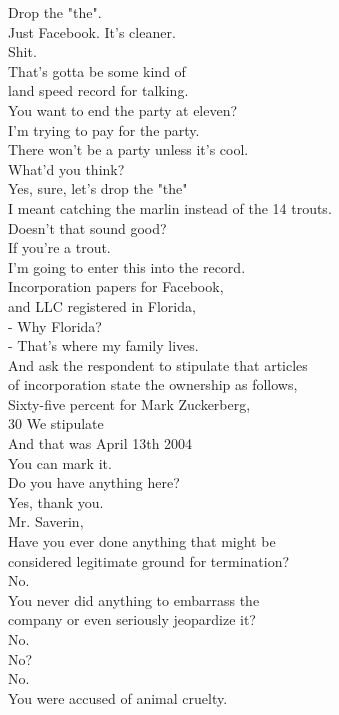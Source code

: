 \documentclass{article}
\begin{document}
\begin{multicols}{3}
Drop the "the".\\
Just Facebook. It's cleaner.\\
Shit.\\
That's gotta be some kind of\\
land speed record for talking.\\
You want to end the party at eleven?\\
I'm trying to pay for the party.\\
There won't be a party unless it's cool.\\
What'd you think?\\
Yes, sure, let's drop the "the"\\
I meant catching the marlin instead of the 14 trouts.\\
Doesn't that sound good?\\
If you're a trout.\\
I'm going to enter this into the record.\\
Incorporation papers for Facebook,\\
and LLC registered in Florida,\\
- Why Florida?\\
- That's where my family lives.\\
And ask the respondent to stipulate that articles\\
of incorporation state the ownership as follows,\\
Sixty-five percent for Mark Zuckerberg,\\
 30%
We stipulate\\
And that was April 13th 2004\\
You can mark it.\\
Do you have anything here?\\
Yes, thank you.\\
Mr. Saverin,\\
Have you ever done anything that might be\\
considered legitimate ground for termination?\\
No.\\
You never did anything to embarrass the\\
company or even seriously jeopardize it?\\
No.\\
No?\\
No.\\
You were accused of animal cruelty.\\

\end{multicols}
\end{document}
